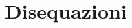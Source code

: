 


% 
%   

% 

\begin{comment}

\begin{inaccessibleblock}[]
\begin{center}
  \
\end{center}
\end{inaccessibleblock}
\end{comment}

\begin{comment}
 
 \begin{minipage}{.45\textwidth}
  
 \end{minipage}
 \begin{minipage}{.25\textwidth}
  
 \end{minipage}
 \begin{minipage}{.3\textwidth}
  
 \end{minipage}
 
\end{comment}

\chapter{Disequazioni}

